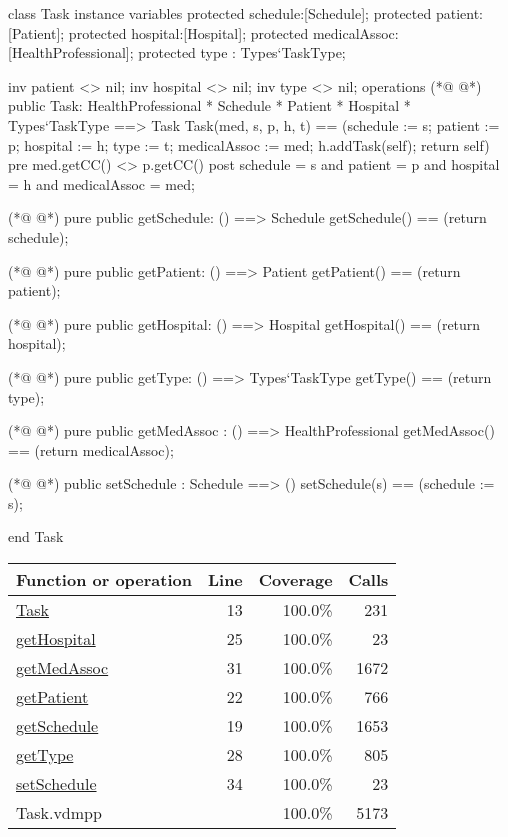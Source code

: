 \begin{vdmpp}[breaklines=true]
class Task
instance variables
  protected schedule:[Schedule];
  protected patient:[Patient];
  protected hospital:[Hospital];
  protected medicalAssoc:[HealthProfessional];
  protected type : Types`TaskType;
  
  inv patient <> nil;
  inv hospital <> nil;
  inv type <> nil;
operations
(*@
\label{Task:13}
@*)
 public Task: HealthProfessional * Schedule * Patient * Hospital * Types`TaskType ==> Task
  Task(med, s, p, h, t) == (schedule := s; patient := p; hospital := h; type := t; medicalAssoc := med; 
             h.addTask(self); return self)
 pre med.getCC() <> p.getCC()
 post schedule = s and patient = p and hospital = h and medicalAssoc = med;
 
(*@
\label{getSchedule:19}
@*)
 pure public getSchedule: () ==> Schedule
  getSchedule() == (return schedule);
  
(*@
\label{getPatient:22}
@*)
 pure public getPatient: () ==> Patient
  getPatient() == (return patient);
  
(*@
\label{getHospital:25}
@*)
 pure public getHospital: () ==> Hospital
  getHospital() == (return hospital);
  
(*@
\label{getType:28}
@*)
 pure public getType: () ==> Types`TaskType
  getType() == (return type);
  
(*@
\label{getMedAssoc:31}
@*)
 pure public getMedAssoc : () ==> HealthProfessional
  getMedAssoc() == (return medicalAssoc);
  
(*@
\label{setSchedule:34}
@*)
 public setSchedule : Schedule ==> ()
  setSchedule(s) == (schedule := s);

end Task
\end{vdmpp}
\bigskip
\begin{longtable}{|l|r|r|r|}
\hline
Function or operation & Line & Coverage & Calls \\
\hline
\hline
\hyperref[Task:13]{Task} & 13&100.0\% & 231 \\
\hline
\hyperref[getHospital:25]{getHospital} & 25&100.0\% & 23 \\
\hline
\hyperref[getMedAssoc:31]{getMedAssoc} & 31&100.0\% & 1672 \\
\hline
\hyperref[getPatient:22]{getPatient} & 22&100.0\% & 766 \\
\hline
\hyperref[getSchedule:19]{getSchedule} & 19&100.0\% & 1653 \\
\hline
\hyperref[getType:28]{getType} & 28&100.0\% & 805 \\
\hline
\hyperref[setSchedule:34]{setSchedule} & 34&100.0\% & 23 \\
\hline
\hline
Task.vdmpp & & 100.0\% & 5173 \\
\hline
\end{longtable}


